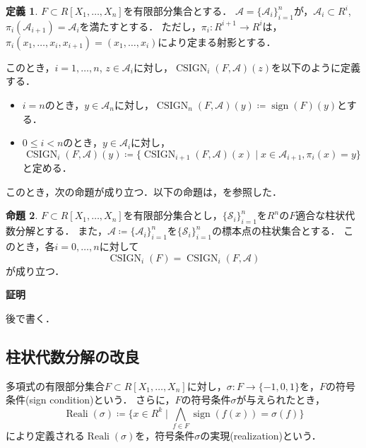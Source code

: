 \documentclass[uplatex, dvipdfmx]{jsarticle}
\makeatletter
\numberwithin{equation}{section}
\renewenvironment{proof}[1][\proofname]{\par
  \pushQED{\qed}%
  \normalfont \topsep6\p@\@plus6\p@\relax
  \trivlist
  \item\relax
  {\bfseries
  #1\@addpunct{.}}\hspace\labelsep\ignorespaces
}{
  \popQED\endtrivlist\@endpefalse
}
\newcommand{\map}[3]{{#1}\colon{#2}\rightarrow{#3}}
\DeclareMathOperator{\Reali}{Reali}
\DeclareMathOperator{\sign}{sign}
\DeclareMathOperator{\CSIGN}{CSIGN}
\theoremstyle{definition}
\newtheorem{definition}{定義}[section]
\newtheorem{proposition}[definition]{命題}
\renewcommand{\proofname}{\textbf{証明}}
\makeatother
\begin{document}
\begin{definition}
     $F \subset R[X_1, \dots, X_n]$を有限部分集合とする．
     $\mathcal{A}=\{\mathcal{A}_{i}\}_{i=1}^n$が，$\mathcal{A}_i \subset R^i$, $\pi_i(\mathcal{A}_{i+1}) = \mathcal{A}_i$を満たすとする．
     ただし，$\map{\pi_i}{R^{i+1}}{R^i}$は，$\pi_i(x_1, \dots, x_i, x_{i+1}) = (x_1, \dots, x_i)$により定まる射影とする．

     このとき，$i=1, \dots, n$, $z \in \mathcal{A}_i$に対し，$\CSIGN_i(F, \mathcal{A})(z)$を以下のように定義する．
     \begin{itemize}
          \item $i=n$のとき，$y \in \mathcal{A}_n$に対し，$\CSIGN_n(F, \mathcal{A})(y)\coloneqq \sign(F)(y)$とする．
          \item $0 \leq i < n$のとき，$y \in \mathcal{A}_i$に対し，
          \begin{equation}
               \CSIGN_i(F, \mathcal{A})(y)\coloneqq \{\CSIGN_{i+1}(F, \mathcal{A})(x) \mid x \in \mathcal{A}_{i+1}, \pi_i(x) = y\}
          \end{equation}
          と定める．
     \end{itemize}
\end{definition}

このとき，次の命題が成り立つ．以下の命題は，\cite[Proposition 11.9.]{MR2248869}を参照した．
\begin{proposition}
     $F \subset R[X_1, \dots, X_n]$を有限部分集合とし，$\{\mathcal{S}_i\}_{i=1}^n$を$R^n$の$F$適合な柱状代数分解とする．
     また，$\mathcal{A}\coloneqq \{\mathcal{A}_{i}\}_{i=1}^n$を$\{\mathcal{S}_i\}_{i=1}^n$の標本点の柱状集合とする．
     このとき，各$i=0, \dots, n$に対して
     \begin{equation}
          \CSIGN_i(F) = \CSIGN_i(F, \mathcal{A})
     \end{equation}
     が成り立つ．
\end{proposition}

\begin{proof}
     後で書く．
\end{proof}


\subsection{柱状代数分解の改良}
多項式の有限部分集合$F \subset R[X_1, \dots, X_n]$に対し，$\map{\sigma}{F}{\{-1,0,1\}}$を，$F$の符号条件(sign condition)という．
さらに，$F$の符号条件$\sigma$が与えられたとき，
\begin{equation}
     \Reali(\sigma)\coloneqq \{x \in R^k \mid \bigwedge_{f \in F} \sign(f(x)) = \sigma(f)\}
\end{equation}
により定義される$\Reali(\sigma)$を，符号条件$\sigma$の実現(realization)という．
\end{document}
